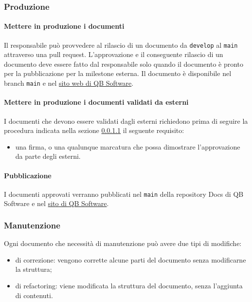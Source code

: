     \subsubsection{Produzione} 
        \paragraph{Mettere in produzione i documenti} \label{sec:doc_production}%
            Il responsabile può provvedere al rilascio di un documento da \verb|develop| al \verb|main| attraverso una pull request. L'approvazione e il conseguente rilascio di un documento deve essere fatto dal responsabile solo quando il documento è pronto per la pubblicazione per la milestone esterna. Il documento è disponibile nel branch \verb|main| e nel \href{https://qb-software-swe.github.io/docs/}{sito web di QB Software}.
            
        \paragraph{Mettere in produzione i documenti validati da esterni} \label{sec:doc_approval_external}%
        	I documenti che devono essere validati dagli esterni richiedono prima di seguire la procedura indicata nella sezione \ref{sec:doc_production} il seguente requisito:
        	\begin{itemize}
        		\item una firma, o una qualunque marcatura che possa dimostrare l'approvazione da parte degli esterni.
        	\end{itemize}

		\paragraph{Pubblicazione}
			I documenti approvati verranno pubblicati nel \verb|main| della repository Docs di QB Software e nel \href{https://qb-software-swe.github.io/docs/site/index.html}{sito di QB Software}.

    \subsubsection{Manutenzione} \label{sec:doc_maintenance}
        Ogni documento che necessità di manutenzione può avere due tipi di modifiche:
        \begin{itemize}
            \item di correzione: vengono corrette alcune parti del documento senza modificarne la struttura;
            \item di refactoring: viene modificata la struttura del documento, senza l'aggiunta di contenuti.
        \end{itemize}